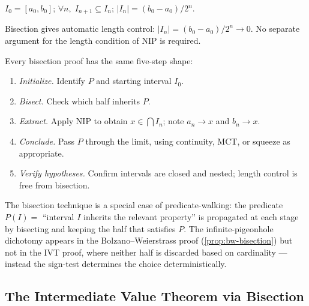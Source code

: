 \begin{remark}
$I_0=[a_0,b_0]$;\;
$\forall n,\;I_{n+1}\subseteq I_n$;\;
$|I_n|=(b_0-a_0)/2^n$.
\end{remark}

\begin{remark}
Bisection gives automatic length control: $|I_n|=(b_0-a_0)/2^n\to 0$.
No separate argument for the length condition of NIP is required.
\end{remark}

\begin{remark}
Every bisection proof has the same five-step shape:
\begin{enumerate}
  \item \emph{Initialize.} Identify $P$ and starting interval $I_0$.
  \item \emph{Bisect.} Check which half inherits $P$.
  \item \emph{Extract.} Apply NIP to obtain $x\in\bigcap I_n$;
        note $a_n\to x$ and $b_n\to x$.
  \item \emph{Conclude.} Pass $P$ through the limit, using continuity,
        MCT, or squeeze as appropriate.
  \item \emph{Verify hypotheses.} Confirm intervals are closed and nested;
        length control is free from bisection.
\end{enumerate}
\end{remark}

\begin{remark}
The bisection technique is a special case of predicate-walking: the predicate
$P(I)=$ ``interval $I$ inherits the relevant property'' is propagated at
each stage by bisecting and keeping the half that satisfies $P$. The
infinite-pigeonhole dichotomy appears in the Bolzano--Weierstrass proof
(\cref{prop:bw-bisection}) but not in the IVT proof, where neither half
is discarded based on cardinality — instead the sign-test determines
the choice deterministically.
\end{remark}



\subsection*{The Intermediate Value Theorem via Bisection}
\label{subsec:ivt-bisection}

